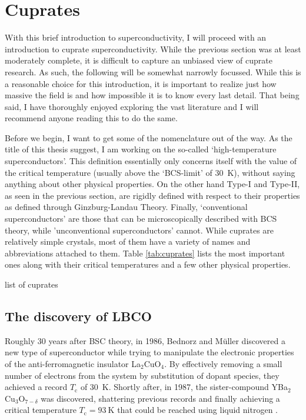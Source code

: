 \section{Cuprates}
With this brief introduction to superconductivity, I will proceed with an introduction to cuprate superconductivity. While the previous section was at least moderately complete, it is difficult to capture an unbiased view of cuprate research. As such, the following will be somewhat narrowly focussed. While this is a reasonable choice for this introduction, it is important to realize just how massive the field is and how impossible it is to know every last detail. That being said, I have thoroughly enjoyed exploring the vast literature and I will recommend anyone reading this to do the same.

Before we begin, I want to get some of the nomenclature out of the way. As the title of this thesis suggest, I am working on the so-called `high-temperature superconductors'. This definition essentially only concerns itself with the value of the critical temperature (usually above the `BCS-limit' of \SI{30}{\kelvin}), without saying anything about other physical properties. On the other hand Type-I and Type-II, as seen in the previous section, are rigidly defined with respect to their properties as defined through Ginzburg-Landau Theory. Finally, `conventional superconductors' are those that can be microscopically described with BCS theory, while 'unconventional superconductors' cannot. While cuprates are relatively simple crystals, most of them have a variety of names and abbreviations attached to them. Table \ref{tab:cuprates} lists the most important ones along with their critical temperatures and a few other physical properties.

\begin{table}
    \caption{list of cuprates}
    \label{tab:cuprates}
\end{table}

\subsection{The discovery of LBCO}
Roughly 30 years after BSC theory, in 1986, Bednorz and M\"uller discovered a new type of superconductor while trying to manipulate the electronic properties of the anti-ferromagnetic insulator La$_2$CuO$_4$. By effectively removing a small number of electrons from the system by substitution of dopant species, they achieved a record $T_\text{c}$ of \SI{30}{\kelvin}. Shortly after, in 1987, the sister-compound YBa$_2$Cu$_3$O$_{7-\delta}$ was discovered, shattering previous records and finally achieving a critical temperature $T_\text{c} = \SI{93}{\kelvin}$ that could be reached using liquid nitrogen \cite{Wu1987}.

